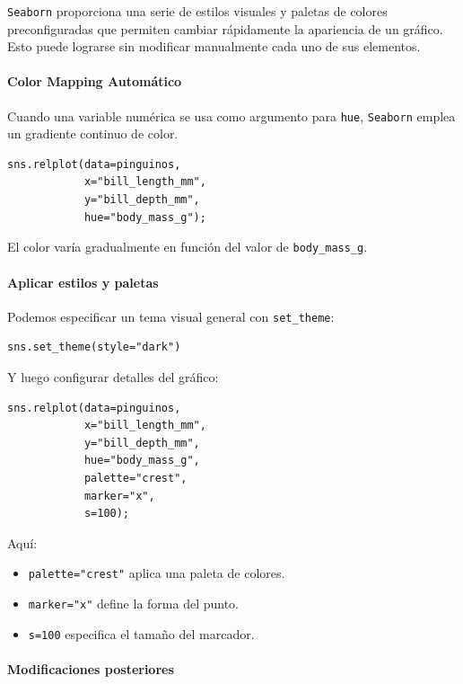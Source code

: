 \documentclass{article}
\theoremstyle{nonumberplain}
\begin{document}
\texttt{Seaborn} proporciona una serie de estilos visuales y paletas de colores preconfiguradas que permiten cambiar rápidamente la apariencia de un gráfico. Esto puede lograrse sin modificar manualmente cada uno de sus elementos.

\paragraph{Color Mapping Automático}

Cuando una variable numérica se usa como argumento para \texttt{hue}, \texttt{Seaborn} emplea un gradiente continuo de color.

\begin{verbatim}
sns.relplot(data=pinguinos,
            x="bill_length_mm",
            y="bill_depth_mm",
            hue="body_mass_g");
\end{verbatim}

El color varía gradualmente en función del valor de \texttt{body\_mass\_g}.

\paragraph{Aplicar estilos y paletas}

Podemos especificar un tema visual general con \texttt{set\_theme}:

\begin{verbatim}
sns.set_theme(style="dark")
\end{verbatim}

Y luego configurar detalles del gráfico:

\begin{verbatim}
sns.relplot(data=pinguinos,
            x="bill_length_mm",
            y="bill_depth_mm",
            hue="body_mass_g",
            palette="crest",
            marker="x",
            s=100);
\end{verbatim}

Aquí:
\begin{itemize}
    \item \texttt{palette="crest"} aplica una paleta de colores.
    \item \texttt{marker="x"} define la forma del punto.
    \item \texttt{s=100} especifica el tamaño del marcador.
\end{itemize}

\paragraph{Modificaciones posteriores}
\end{document}
